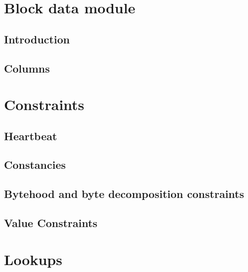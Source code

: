 \section{Block data module}
\subsection{Introduction}                                \label{block data: intro}              
\subsection{Columns}                                     \label{block data: columns}            

\section{Constraints}
\subsection{Heartbeat}                                   \label{block data: heartbeat}          
\subsection{Constancies}                                 \label{block data: constancies}        
\subsection{Bytehood and byte decomposition constraints} \label{block data: byte decomposition} 
\subsection{Value Constraints}                           \label{block data: timestamp monotony} 

\section{Lookups}                                        \label{block data: lookups}             

	
